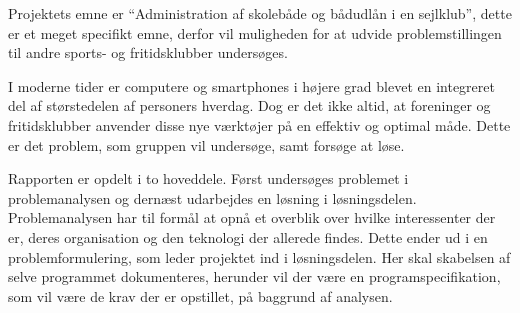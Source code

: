 Projektets emne er ``Administration af skolebåde og bådudlån i en sejlklub'', dette er et meget specifikt
emne, derfor vil  muligheden for at udvide problemstillingen til andre sports- og fritidsklubber undersøges.

I moderne tider er computere og smartphones i højere grad blevet en integreret del af størstedelen af
personers hverdag. Dog er det ikke altid, at foreninger og fritidsklubber anvender disse nye
værktøjer på en effektiv og optimal måde. Dette er det problem, som gruppen vil undersøge, samt forsøge at løse.

Rapporten er opdelt i to hoveddele. Først undersøges problemet i problemanalysen og dernæst udarbejdes en
løsning i løsningsdelen. Problemanalysen har til formål at opnå et overblik over hvilke interessenter der er,
deres organisation og den teknologi der allerede findes. Dette ender ud i en problemformulering, som leder
projektet ind i løsningsdelen. Her skal skabelsen af selve programmet dokumenteres, herunder vil der være en
programspecifikation, som vil være de krav der er opstillet, på baggrund af analysen. 
